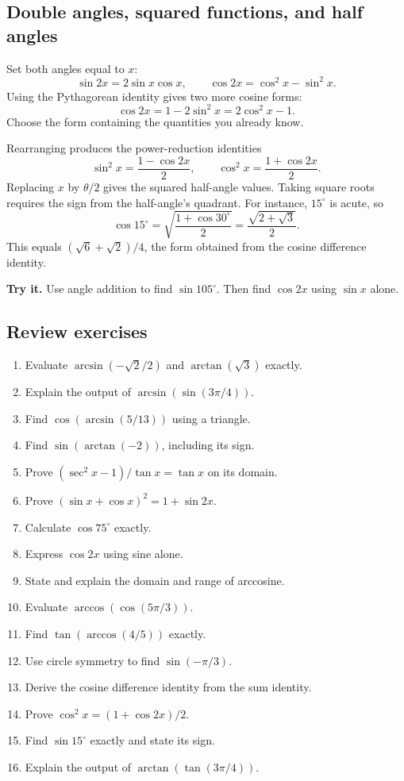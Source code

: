\hypertarget{m4-double-angles-squared-functions-and-half-angles}{%
\subsection{Double angles, squared functions, and half angles}\label{m4-double-angles-squared-functions-and-half-angles}}

Set both angles equal to \(x\): \[
\sin2x=2\sin x\cos x,\qquad
\cos2x=\cos^2x-\sin^2x.
\] Using the Pythagorean identity gives two more cosine forms: \[
\cos2x=1-2\sin^2x=2\cos^2x-1.
\] Choose the form containing the quantities you already know.

Rearranging produces the power-reduction identities \[
\sin^2x=\frac{1-\cos2x}{2},\qquad
\cos^2x=\frac{1+\cos2x}{2}.
\] Replacing \(x\) by \(\theta/2\) gives the squared half-angle values. Taking square roots requires the sign from the half-angle's quadrant. For instance, \(15^\circ\) is acute, so \[
\cos15^\circ=\sqrt{\frac{1+\cos30^\circ}{2}}
=\frac{\sqrt{2+\sqrt3}}{2}.
\] This equals \((\sqrt6+\sqrt2)/4\), the form obtained from the cosine difference identity.

\textbf{Try it.} Use angle addition to find \(\sin105^\circ\). Then find \(\cos2x\) using \(\sin x\) alone.

\hypertarget{m4-review-exercises}{%
\subsection{Review exercises}\label{m4-review-exercises}}

\begin{enumerate}
\def\labelenumi{\arabic{enumi}.}
\tightlist
\item
  Evaluate \(\arcsin(-\sqrt2/2)\) and \(\arctan(\sqrt3)\) exactly.
\item
  Explain the output of \(\arcsin(\sin(3\pi/4))\).
\item
  Find \(\cos(\arcsin(5/13))\) using a triangle.
\item
  Find \(\sin(\arctan(-2))\), including its sign.
\item
  Prove \((\sec^2x-1)/\tan x=\tan x\) on its domain.
\item
  Prove \((\sin x+\cos x)^2=1+\sin2x\).
\item
  Calculate \(\cos75^\circ\) exactly.
\item
  Express \(\cos2x\) using sine alone.
\item
  State and explain the domain and range of arccosine.
\item
  Evaluate \(\arccos(\cos(5\pi/3))\).
\item
  Find \(\tan(\arccos(4/5))\) exactly.
\item
  Use circle symmetry to find \(\sin(-\pi/3)\).
\item
  Derive the cosine difference identity from the sum identity.
\item
  Prove \(\cos^2x=(1+\cos2x)/2\).
\item
  Find \(\sin15^\circ\) exactly and state its sign.
\item
  Explain the output of \(\arctan(\tan(3\pi/4))\).
\end{enumerate}

